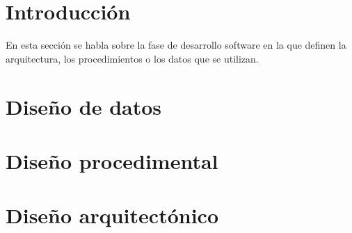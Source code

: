 
\section{Introducción}
En esta sección se habla sobre la fase de desarrollo software en la que definen la arquitectura, los procedimientos o los datos que se utilizan. 

\section{Diseño de datos}

\section{Diseño procedimental}

\section{Diseño arquitectónico}


